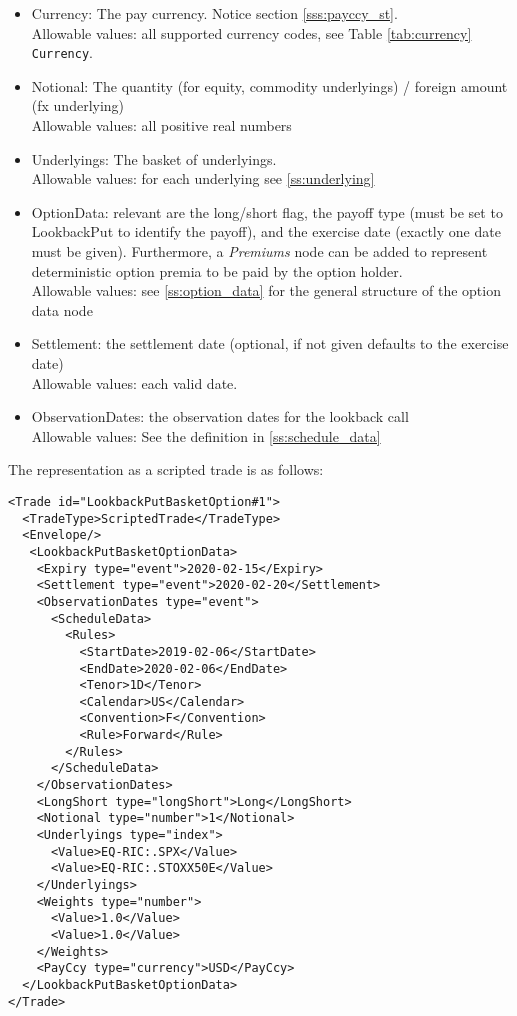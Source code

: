 \begin{itemize}
\item Currency: The pay currency. Notice section \ref{sss:payccy_st}. \\
  Allowable values: all supported currency codes, see Table \ref{tab:currency} \lstinline!Currency!.
\item Notional: The quantity (for equity, commodity underlyings) / foreign amount (fx underlying) \\
  Allowable values: all positive real numbers
\item Underlyings: The basket of underlyings. \\
  Allowable values: for each underlying see \ref{ss:underlying}
\item OptionData: relevant are the long/short flag, the payoff type (must be set to LookbackPut to
  identify the payoff), and the exercise date (exactly one date must be given). Furthermore, a \emph{Premiums} node can be added to represent deterministic option premia to be paid by the option holder. \\
  Allowable values: see \ref{ss:option_data} for the general structure of the option data node
\item Settlement: the settlement date (optional, if not given defaults to the exercise date) \\
  Allowable values: each valid date.
\item ObservationDates: the observation dates for the lookback call \\
  Allowable values: See the definition in \ref{ss:schedule_data}
\end{itemize}

The representation as a scripted trade is as follows:

\begin{verbatim}
<Trade id="LookbackPutBasketOption#1">
  <TradeType>ScriptedTrade</TradeType>
  <Envelope/>
   <LookbackPutBasketOptionData>
    <Expiry type="event">2020-02-15</Expiry>
    <Settlement type="event">2020-02-20</Settlement>
    <ObservationDates type="event">
      <ScheduleData>
        <Rules>
          <StartDate>2019-02-06</StartDate>
          <EndDate>2020-02-06</EndDate>
          <Tenor>1D</Tenor>
          <Calendar>US</Calendar>
          <Convention>F</Convention>
          <Rule>Forward</Rule>
        </Rules>
      </ScheduleData>
    </ObservationDates>
    <LongShort type="longShort">Long</LongShort>
    <Notional type="number">1</Notional>
    <Underlyings type="index">
      <Value>EQ-RIC:.SPX</Value>
      <Value>EQ-RIC:.STOXX50E</Value>
    </Underlyings>
    <Weights type="number">
      <Value>1.0</Value>
      <Value>1.0</Value>
    </Weights>
    <PayCcy type="currency">USD</PayCcy>
  </LookbackPutBasketOptionData>
</Trade>
\end{verbatim}

